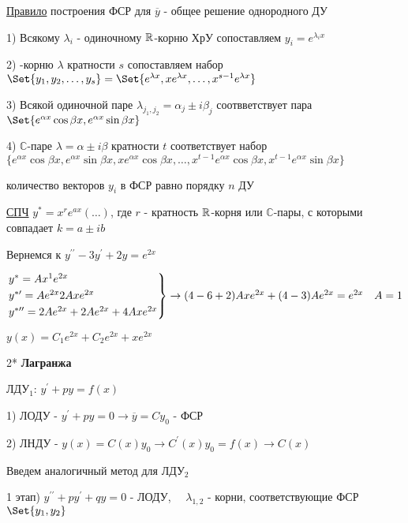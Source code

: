 \documentclass[12pt]{article}
\begin{document}
    \vspace{5mm}
    \underline{Правило} построения ФСР для $\overline{y}$ - общее решение однородного ДУ

    1) Всякому $\lambda_i$ - одиночному $\mathbb{R}$-корню ХрУ сопоставляем $y_i = e^{\lambda_i x}$

    2) \Real-корню $\lambda$ кратности $s$ сопоставляем набор $\Set{y_1, y_2, \dots, y_s} = \Set{e^{\lambda x}, xe^{\lambda x}, \dots, x^{s - 1} e^{\lambda x}}$

    3) Всякой одиночной паре $\lambda_{j_1,j_2} = \alpha_j \pm i\beta_j$ соотвветствует пара $\Set{e^{\alpha x} \cos\beta x, e^{\alpha x} \sin\beta x}$

    4) $\mathbb{C}$-паре $\lambda = \alpha \pm i\beta$ кратности $t$ соответствует набор $\{e^{\alpha x} \cos \beta x, e^{\alpha x} \sin \beta x, x e^{\alpha x} \cos \beta x, \dots, x^{t - 1}e^{\alpha x} \cos\beta x, x^{t - 1}e^{\alpha x} \sin\beta x\}$

    \Nota количество векторов $y_i$ в ФСР равно порядку $n$ ДУ

    \underline{СПЧ} $y^* = x^r e^{ax} (\dots)$, где $r$ - кратность $\mathbb{R}$-корня или $\mathbb{C}$-пары, с которыми совпадает $k = a \pm ib$

    \Ex Вернемся к $y^{\prime\prime} - 3y^\prime + 2y = e^{2x}$

    $\begin{rcases*}
    y^* = Ax^1 e^{2x} \\

    y^{*\prime} = Ae^{2x} 2Axe^{2x} \\

    y^{*\prime\prime} = 2Ae^{2x} + 2Ae^{2x} + 4Axe^{2x}
    \end{rcases*} \to (4 - 6 + 2) Axe^{2x} + (4 - 3) Ae^{2x} = e^{2x} \quad A = 1$

    $y(x) = C_1 e^{2x} + C_2 e^{2x} + xe^{2x}$

    \vspace{10mm}

    2* \textbf{Лагранжа}

    \Mem ЛДУ$_1$: $y^\prime + py = f(x)$

    1) ЛОДУ - $y^\prime + py = 0 \to \overline{y} = Cy_0$ - ФСР

    2) ЛНДУ - $y(x) = C(x)y_0 \longrightarrow C^\prime(x) y_0 = f(x) \to C(x)$

    \Nota Введем аналогичный метод для ЛДУ$_2$

    1 этап) $y^{\prime\prime} + py^\prime + qy = 0$ - ЛОДУ, $\quad \lambda_{1, 2}$ - корни, соответствующие ФСР $\Set{y_1, y_2}$
\end{document}
